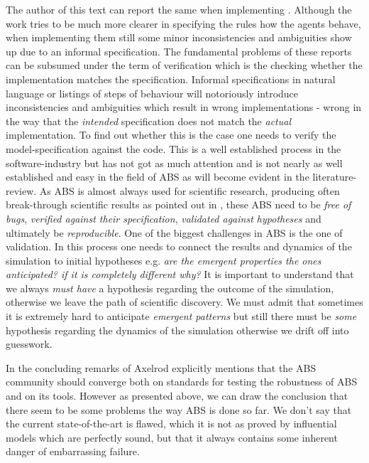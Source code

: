 The author of this text can report the same when implementing \cite{epstein_growing_1996}. Although the work tries to be much more clearer in specifying the rules how the agents behave, when implementing them still some minor inconsistencies and ambiguities show up due to an informal specification.
The fundamental problems of these reports can be subsumed under the term of verification which is the checking whether the implementation matches the specification. Informal specifications in natural language or listings of steps of behaviour will notoriously introduce inconsistencies and ambiguities which result in wrong implementations - wrong in the way that the \textit{intended} specification does not match the \textit{actual} implementation. To find out whether this is the case one needs to verify the model-specification against the code. This is a well established process in the software-industry but has not got as much attention and is not nearly as well established and easy in the field of ABS as will become evident in the literature-review.
As ABS is almost always used for scientific research, producing often break-through scientific results as pointed out in \cite{axelrod_chapter_2006}, these ABS need to be \textit{free of bugs}, \textit{verified against their specification}, \textit{validated against hypotheses} and ultimately be \textit{reproducible}. One of the biggest challenges in ABS is the one of validation. In this process one needs to connect the results and dynamics of the simulation to initial hypotheses e.g. \textit{are the emergent properties the ones anticipated? if it is completely different why?} It is important to understand that we always \textit{must have} a hypothesis regarding the outcome of the simulation, otherwise we leave the path of scientific discovery. We must admit that sometimes it is extremely hard to anticipate \textit{emergent patterns} but still there must be \textit{some} hypothesis regarding the dynamics of the simulation otherwise we drift off into guesswork.

In the concluding remarks of \cite{axelrod_chapter_2006} Axelrod explicitly mentions that the ABS community should converge both on standards for testing the robustness of ABS and on its tools. However as presented above, we can draw the conclusion that there seem to be some problems the way ABS is done so far. We don't say that the current state-of-the-art is flawed, which it is not as proved by influential models which are perfectly sound, but that it always contains some inherent danger of embarrassing failure.

